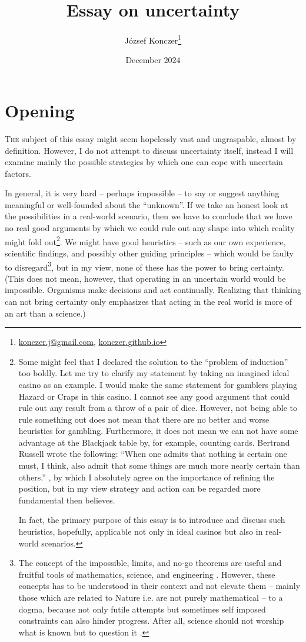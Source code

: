 \documentclass{article}
\title{{\bf Essay on uncertainty} \\ \pgfornament[height=0.8cm]{84}}
\author{József Konczer\footnote{
\href{mailto:konczer.j@gmail.com}{konczer.j@gmail.com},
\href{https://konczer.github.io/}{konczer.github.io}}
}
\date{December 2024}
\begin{document}
\maketitle

\section*{Opening}


\lettrine[lines=2]{T}{he} subject of this essay might seem hopelessly vast and ungraspable, almost by definition.
However, I do not attempt to discuss uncertainty itself, instead I will examine mainly the possible strategies by which one can cope with uncertain factors.

In general, it is very hard -- perhaps impossible -- to say or suggest anything meaningful or well-founded about the ``unknown''. If we take an honest look at the possibilities in a real-world scenario, then we have to conclude that we have no real good arguments by which we could rule out any shape into which reality might fold out\footnote{Some might feel that I declared the solution to the ``problem of induction'' \cite{sep:Induction} too boldly. Let me try to clarify my statement by taking an imagined ideal casino as an example. I would make the same statement for gamblers playing Hazard or Craps in this casino. I cannot see any good argument that could rule out any result from a throw of a pair of dice. However, not being able to rule something out does not mean that there are no better and worse heuristics for gambling. Furthermore, it does not mean we can not have some advantage at the Blackjack table by, for example, counting cards.
Bertrand Russell wrote the following: ``When one admits that nothing is certain one must, I think, also admit that some things are much more nearly certain than others.'' \cite{book:AtheistOrAgnosticRussell}, by which I absolutely agree on the importance of refining the position, but in my view strategy and action can be regarded more fundamental then believes.

In fact, the primary purpose of this essay is to introduce and discuss such heuristics, hopefully, applicable not only in ideal casinos but also in real-world scenarios.
}.
We might have good heuristics -- such as our own experience, scientific findings, and possibly other guiding principles -- which would be faulty to disregard\footnote{The concept of the impossible, limits, and no-go theorems are useful and fruitful tools of mathematics, science, and engineering \cite{book:Impossibility}. However, these concepts has to be understood in their context and not elevate them -- mainly those which are related to Nature i.e. are not purely mathematical -- to a dogma, because not only futile attempts but sometimes self imposed constraints can also hinder progress. After all, science should not worship what is known but to question it \cite{book:TheAscentOfMan}.}, but in my view, none of these has the power to bring certainty.
(This does not mean, however, that operating in an uncertain world would be impossible. Organisms make decisions and act continually. Realizing that thinking can not bring certainty only emphasizes that acting in the real world is more of an art than a science.)
\end{document}
